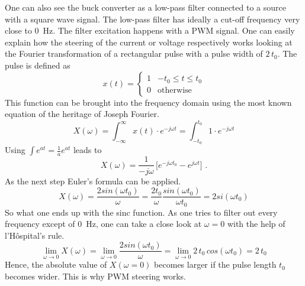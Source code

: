 \newpar
One can also see the buck converter as a low-pass filter connected to a source with a square wave signal. The low-pass filter has ideally a cut-off frequency very close to \SI{0}{\Hz}. The filter excitation happens with a \gls{PWM} signal. One can easily explain how the steering of the current or voltage respectively works looking at the Fourier transformation of a rectangular pulse with a pulse width of \ensuremath{2\,t_0}. The pulse is defined as 
\begin{equation}
    x(t) = \begin{cases}
               1               & -t_0 \leq t \leq t_0\\
               0               & \text{otherwise}
           \end{cases}
\end{equation}
This function can be brought into the frequency domain using the most known equation of the heritage of Joseph Fourier. 
\begin{equation}
X(\omega) = \int_{-\infty}^{\infty} x(t) \cdot e^{-j \omega t} = \int_{-t_0}^{t_0} 1 \cdot e^{-j \omega t}
\end{equation}
Using \ensuremath{\int e^{at} = \frac{1}{a} e^{at}} leads to 
\begin{equation}
X(\omega) = \frac{1}{-j \omega} \, \bigl[ e^{-j \omega t_0} -  e^{j \omega t} \bigr] \text{ .}
\end{equation}
As the next step Euler's formula can be applied.
\begin{equation}
X(\omega) = \frac{2 sin(\omega t_0)}{\omega}  = \frac{2 t_0}{\omega} \frac{sin(\omega t_0)}{\omega t_0} = 2 si(\omega t_0)
\end{equation}
So what one ends up with the sinc function. As one tries to filter out every frequency except of \SI{0}{\Hz}, one can take a close look at \ensuremath{\omega = 0} with the help of l'H\^{o}spital's rule. 
\begin{equation}
\lim_{\omega \to 0} X(\omega) = \lim_{\omega \to 0} \frac{2 sin(\omega t_0)}{\omega} = \lim_{\omega \to 0} 2\,t_0\,cos(\omega t_0) = 2\,t_0  
\end{equation}
Hence, the absolute value of \ensuremath{X(\omega = 0)} becomes larger if the pulse length \ensuremath{t_0} becomes wider. This is why \gls{PWM} steering works. 

